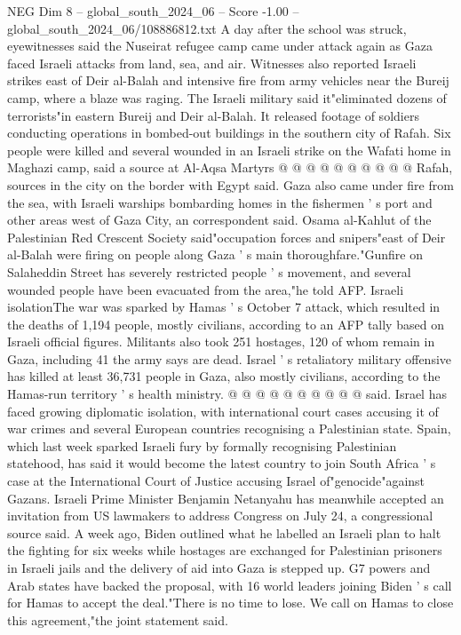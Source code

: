 \begin{textsample}{NEG Dim 8 – global\_south\_2024\_06 – Score -1.00 – global\_south\_2024\_06/108886812.txt}
A day after the school was struck, eyewitnesses said the Nuseirat refugee camp came under attack again as Gaza faced Israeli attacks from land, sea, and air.
Witnesses also reported Israeli strikes east of Deir al-Balah and intensive fire from army vehicles near the Bureij camp, where a blaze was raging.
The Israeli military said it"eliminated dozens of terrorists"in eastern Bureij and Deir al-Balah.
It released footage of soldiers conducting operations in bombed-out buildings in the southern city of Rafah.
Six people were killed and several wounded in an Israeli strike on the Wafati home in Maghazi camp, said a source at Al-Aqsa Martyrs @ @ @ @ @ @ @ @ @ @ Rafah, sources in the city on the border with Egypt said.
Gaza also came under fire from the sea, with Israeli warships bombarding homes in the fishermen ' s port and other areas west of Gaza City, an correspondent said.
Osama al-Kahlut of the Palestinian Red Crescent Society said"occupation forces and snipers"east of Deir al-Balah were firing on people along Gaza ' s main thoroughfare."Gunfire on Salaheddin Street has severely restricted people ' s movement, and several wounded people have been evacuated from the area,"he told AFP.
Israeli isolationThe war was sparked by Hamas ' s October 7 attack, which resulted in the deaths of 1,194 people, mostly civilians, according to an AFP tally based on Israeli official figures.
Militants also took 251 hostages, 120 of whom remain in Gaza, including 41 the army says are dead.
Israel ' s retaliatory military offensive has killed at least 36,731 people in Gaza, also mostly civilians, according to the Hamas-run territory ' s health ministry. @ @ @ @ @ @ @ @ @ @ said.
Israel has faced growing diplomatic isolation, with international court cases accusing it of war crimes and several European countries recognising a Palestinian state.
Spain, which last week sparked Israeli fury by formally recognising Palestinian statehood, has said it would become the latest country to join South Africa ' s case at the International Court of Justice accusing Israel of"genocide"against Gazans.
Israeli Prime Minister Benjamin Netanyahu has meanwhile accepted an invitation from US lawmakers to address Congress on July 24, a congressional source said.
A week ago, Biden outlined what he labelled an Israeli plan to halt the fighting for six weeks while hostages are exchanged for Palestinian prisoners in Israeli jails and the delivery of aid into Gaza is stepped up.
G7 powers and Arab states have backed the proposal, with 16 world leaders joining Biden ' s call for Hamas to accept the deal."There is no time to lose.
We call on Hamas to close this agreement,"the joint statement said.

\end{textsample}
